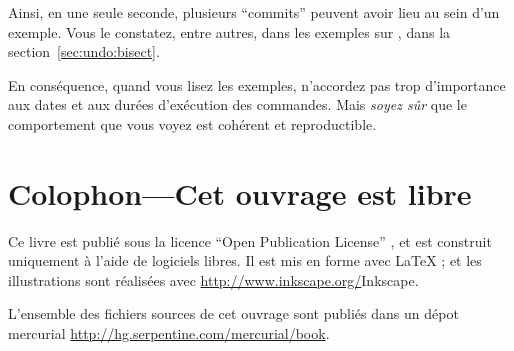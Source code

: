 Ainsi, en une seule seconde, plusieurs ``commits'' peuvent avoir lieu
au sein d'un exemple. Vous le constatez, entre autres, dans les 
exemples sur , dans la section~\ref{sec:undo:bisect}.

En conséquence, quand vous lisez les exemples, n'accordez pas trop
d'importance aux dates et aux durées d'exécution des commandes. Mais
\emph{soyez sûr} que le comportement que vous voyez est cohérent et
reproductible.

\section{Colophon---Cet ouvrage est libre}

Ce livre est publié sous la licence ``Open Publication License''
, et est construit uniquement à l'aide de logiciels libres. Il est mis
en forme avec \LaTeX{} ; et les illustrations sont réalisées avec 
\url{http://www.inkscape.org/}{Inkscape}.

L'ensemble des fichiers sources de cet ouvrage sont publiés dans un
dépot mercurial  \url{http://hg.serpentine.com/mercurial/book}.

